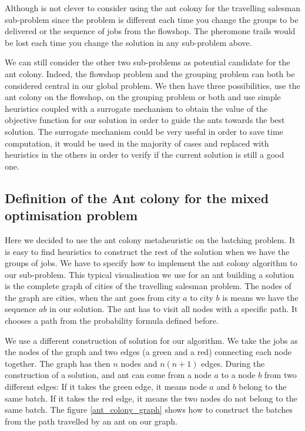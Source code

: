 \documentclass[UTF8, twoside]{EPURapport}
\begin{document}
	Although is not clever to consider using the ant colony for the travelling salesman sub-problem since the problem is different each time you change the groups to be delivered or the sequence of jobs from the flowshop. The pheromone trails would be lost each time you change the solution in any sub-problem above.
	
	We can still consider the other two sub-problems as potential candidate for the ant colony. Indeed, the flowshop problem and the grouping problem can both be considered central in our global problem. We then have three possibilities, use the ant colony on the flowshop, on the grouping problem or both and use simple heuristics coupled with a surrogate mechanism to obtain the value of the objective function for our solution in order to guide the ants towards the best solution. The surrogate mechanism could be very useful in order to save time computation, it would be used in the majority of cases and replaced with heuristics in the others in order to verify if the current solution is still a good one.
\\	

\subsection{Definition of the Ant colony for the mixed optimisation problem}
	
	\hspace{4ex}Here we decided to use the ant colony metaheuristic on the batching problem. It is easy to find heuristics to construct the rest of the solution when we have the groups of jobs. We have to specify how to implement the ant colony algorithm to our sub-problem. This typical visualisation we use for an ant building a solution is the complete graph of cities of the travelling salesman problem. The nodes of the graph are cities, when the ant goes from city $a$ to city $b$ is means we have the sequence $ab$ in our solution. The ant has to visit all nodes with a specific path. It chooses a path from the probability formula defined before.
	
	We use a different construction of solution for our algorithm. We take the jobs as the nodes of the graph and two edges (a green and a red) connecting each node together. The graph has then $n$ nodes and $n(n+1)$ edges. During the construction of a solution, and ant can come from a node $a$ to a node $b$ from two different edges: If it takes the green edge, it means node $a$ and $b$ belong to the same batch. If it takes the red edge, it means the two nodes do not belong to the same batch. The figure \ref{ant_colony_graph} shows how to construct the batches from the path travelled by an ant on our graph.
\\
\end{document}
